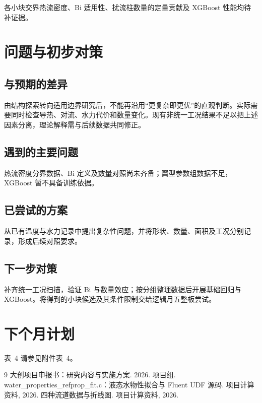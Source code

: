 \documentclass[stage2,fontset=fandol]{ydzjreport}
\makeatletter
\newcommand{\submissionnumber}[1]{\def\@currentlabel{#1}}
\makeatother
\begin{document}
各小块交界热流密度、Bi 适用性、扰流柱数量的定量贡献及 XGBoost 性能均待补证据。

\section{问题与初步对策}

\subsection{与预期的差异}

由结构探索转向适用边界研究后，不能再沿用“更复杂即更优”的直观判断。实际需要同时检查导热、对流、水力代价和数量变化。现有非统一工况结果不足以把上述因素分离，理论解释需与后续数据共同修正。



\subsection{遇到的主要问题}

热流密度分界数据、Bi 定义及数量对照尚未齐备；翼型参数组数据不足，XGBoost 暂不具备训练依据。

\subsection{已尝试的方案}

从已有温度与水力记录中提出复杂性问题，并将形状、数量、面积及工况分别记录，形成后续对照要求。

\subsection{下一步对策}

补齐统一工况扫描，验证 Bi 与数量效应；按分组整理数据后开展基础回归与 XGBoost。将得到的小块候选及其条件限制交给逻辑月五整板尝试。

\section{下个月计划}


\par\noindent \begingroup\submissionnumber{4}\label{tab:plan}\endgroup 表~4 请参见附件表~4。\par




\begin{thebibliography}{9}
 大创项目申报书：研究内容与实施方案. 2026.
 项目组. water\_properties\_refprop\_fit.c：液态水物性拟合与 Fluent UDF 源码. 项目计算资料, 2026.
 四种流道数据与折线图. 项目计算资料, 2026.
\end{thebibliography}
\end{document}
